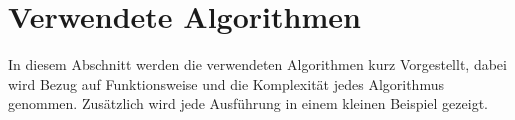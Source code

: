 \section{Verwendete Algorithmen}

In diesem Abschnitt werden die verwendeten Algorithmen kurz Vorgestellt, dabei wird Bezug auf Funktionsweise und die Komplexität jedes Algorithmus genommen. Zusätzlich wird jede Ausführung in einem kleinen Beispiel gezeigt.